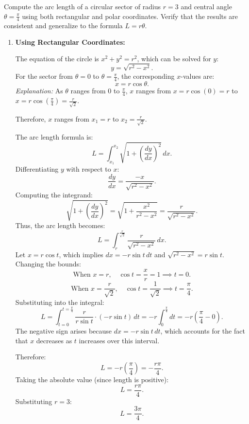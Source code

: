 \exampleline
\begin{example}
Compute the arc length of a circular sector of radius \( r = 3 \) and central angle \( \theta = \frac{\pi}{4} \) using both rectangular and polar coordinates. Verify that the results are consistent and generalize to the formula \( L = r \theta \).

\begin{solution}
\begin{enumerate}
    \item \textbf{Using Rectangular Coordinates:}
    
    The equation of the circle is \( x^2 + y^2 = r^2 \), which can be solved for \( y \):
    \[
    y = \sqrt{r^2 - x^2}.
    \]
    For the sector from \( \theta = 0 \) to \( \theta = \frac{\pi}{4} \), the corresponding \( x \)-values are:
    \[
    x = r \cos \theta.
    \]
    \emph{Explanation:} As \( \theta \) ranges from \( 0 \) to \( \frac{\pi}{4} \), \( x \) ranges from \( x = r \cos\left(0\right) = r \) to \( x = r \cos\left(\frac{\pi}{4}\right) = \frac{r}{\sqrt{2}} \).

    Therefore, \( x \) ranges from \( x_1 = r \) to \( x_2 = \frac{r}{\sqrt{2}} \).

    The arc length formula is:
    \[
    L = \int_{x_1}^{x_2} \sqrt{1 + \left( \frac{dy}{dx} \right)^2 } \, dx.
    \]
    Differentiating \( y \) with respect to \( x \):
    \[
    \frac{dy}{dx} = \frac{-x}{\sqrt{r^2 - x^2}}.
    \]
    Computing the integrand:
    \[
    \sqrt{1 + \left( \frac{dy}{dx} \right)^2 } = \sqrt{1 + \frac{x^2}{r^2 - x^2}} = \frac{r}{\sqrt{r^2 - x^2}}.
    \]
    Thus, the arc length becomes:
    \[
    L = \int_{r}^{\frac{r}{\sqrt{2}}} \frac{r}{\sqrt{r^2 - x^2}} \, dx.
    \]
    Let \( x = r \cos t \), which implies \( dx = -r \sin t \, dt \) and \( \sqrt{r^2 - x^2} = r \sin t \). Changing the bounds:
    \[
    \text{When } x = r, \quad \cos t = \frac{x}{r} = 1 \implies t = 0.
    \]
    \[
    \text{When } x = \frac{r}{\sqrt{2}}, \quad \cos t = \frac{1}{\sqrt{2}} \implies t = \frac{\pi}{4}.
    \]
    Substituting into the integral:
    \[
    L = \int_{t = 0}^{t = \frac{\pi}{4}} \frac{r}{r \sin t} \cdot (-r \sin t) \, dt = -r \int_{0}^{\frac{\pi}{4}} dt = -r \left( \frac{\pi}{4} - 0 \right).
    \]
    The negative sign arises because \( dx = -r \sin t \, dt \), which accounts for the fact that \( x \) decreases as \( t \) increases over this interval.

    Therefore:
    \[
    L = -r \left( \frac{\pi}{4} \right) = -\frac{r \pi}{4}.
    \]
    Taking the absolute value (since length is positive):
    \[
    L = \frac{r \pi}{4}.
    \]
    Substituting \( r = 3 \):
    \[
    L = \frac{3 \pi}{4}.
    \]


\end{enumerate}
\end{solution}
\end{example}
